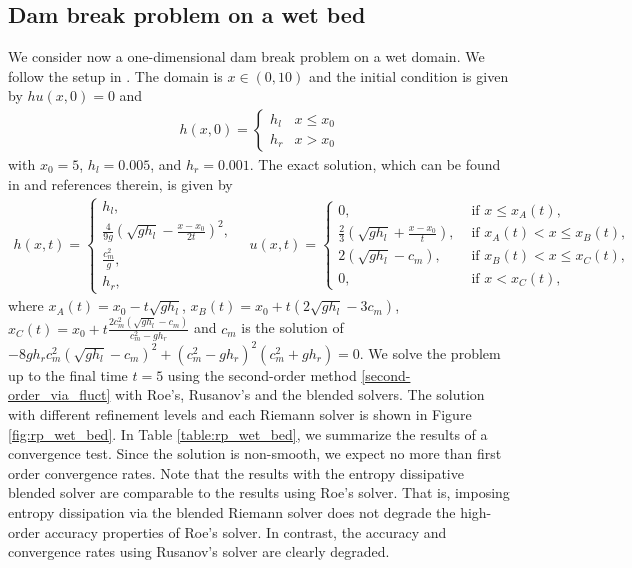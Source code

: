 \documentclass[preprint, 11pt]{article}
\begin{document}
\subsection{Dam break problem on a wet bed}\label{sec:rp_wet_bed}
We consider now a one-dimensional dam break problem on a wet domain.
We follow the setup in \cite[\S 4.1.1]{delestre2013swashes}.
The domain is $x\in(0,10)$ and the initial condition is given by
$hu(x,0)=0$ and
\begin{align*}
  h(x,0) =
  \begin{cases}
    h_l & x \leq x_0 \\
    h_r & x > x_0
  \end{cases}
\end{align*}
with $x_0=5$, $h_l=0.005$, and $h_r=0.001$.  The exact solution, which can be found in
\cite{delestre2013swashes} and references therein, is given by
\begin{align*}
  h(x,t) =
  \begin{cases}
    h_l, \\
    \frac{4}{9g}\left(\sqrt{gh_l}-\frac{x-x_0}{2t}\right)^2, \\
    \frac{c_m^2}{g}, \\
    h_r,
  \end{cases}
\quad
  u(x,t) =
  \begin{cases}
    0, &\mbox{ if } x\leq x_A(t), \\
    \frac{2}{3}\left(\sqrt{gh_l}+\frac{x-x_0}{t}\right), & \mbox{ if } x_A(t) < x\leq x_B(t), \\
    2(\sqrt{gh_l}-c_m), & \mbox{ if } x_B(t)<x\leq x_C(t), \\
    0, &\mbox{ if } x < x_C(t),
  \end{cases}
\end{align*}
where $x_A(t)=x_0-t\sqrt{gh_l}$, $x_B(t)=x_0+t\left(2\sqrt{gh_l}-3c_m\right)$,
$x_C(t)=x_0+t\frac{2c_m^2\left(\sqrt{gh_l}-c_m\right)}{c_m^2-gh_r}$ and
$c_m$ is the solution of
$-8gh_rc_m^2\left(\sqrt{gh_l}-c_m\right)^2+\left(c_m^2-gh_r\right)^2\left(c_m^2+gh_r\right)=0$.
We solve the problem up to the final time $t=5$ using the
second-order method \eqref{second-order_via_fluct}
with Roe's, Rusanov's and the blended solvers. The solution with different refinement levels
and each Riemann solver is shown in Figure \ref{fig:rp_wet_bed}.
In Table \ref{table:rp_wet_bed}, we summarize the results of a convergence test.
Since the solution is non-smooth, we expect no more than first order convergence rates. Note that the
results with the entropy dissipative blended solver are comparable to the results using Roe's solver.
That is, imposing entropy dissipation via the blended Riemann solver does not degrade the high-order
accuracy properties of Roe's solver.
In contrast, the accuracy and convergence rates using Rusanov's solver are clearly degraded.
\end{document}
